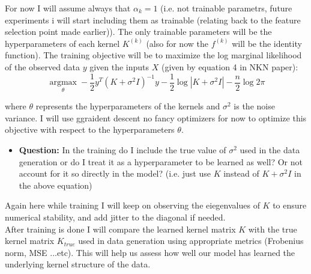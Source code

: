 \documentclass[12pt]{article}
\begin{document}
For now I will assume always that $\alpha_k=1$ (i.e. not trainable parametrs, future experiments i will start including them as trainable (relating back to the feature selection point made earlier)). The only trainable parameters will be the hyperparameters of each kernel $K^{(k)}$ (also for now the $f^{(k)}$ will be the identity function). The training objective will be to maximize the log marginal likelihood of the observed data $y$ given the inputs $X$ (given by equation 4 in NKN paper):
\[
\operatorname*{argmax}_{\theta} -\frac{1}{2} y^T (K + \sigma^2 I)^{-1} y - \frac{1}{2} \log |K + \sigma^2 I| - \frac{n}{2} \log 2\pi
\]

where $\theta$ represents the hyperparameters of the kernels and $\sigma^2$ is the noise variance. I will use ggraident descent no fancy optimizers for now to optimize this objective with respect to the hyperparameters $\theta$.
\begin{itemize}
  \item \textbf{Question:} In the training do I include the true value of $\sigma^2$ used in the data generation or do I treat it as a hyperparameter to be learned as well? Or not account for it so directly in the model? (i.e. just use $K$ instead of $K + \sigma^2 I$ in the above equation)
\end{itemize}
Again here while training I will keep on observing the eiegenvalues of $K$ to ensure numerical stability, and add jitter to the diagonal if needed. \\ 

After training is done I will compare the learned kernel matrix $K$ with the true kernel matrix $K_{true}$ used in data generation using appropriate metrics (Frobenius norm, MSE ...etc). This will help us assess how well our model has learned the underlying kernel structure of the data. 
\end{document}
